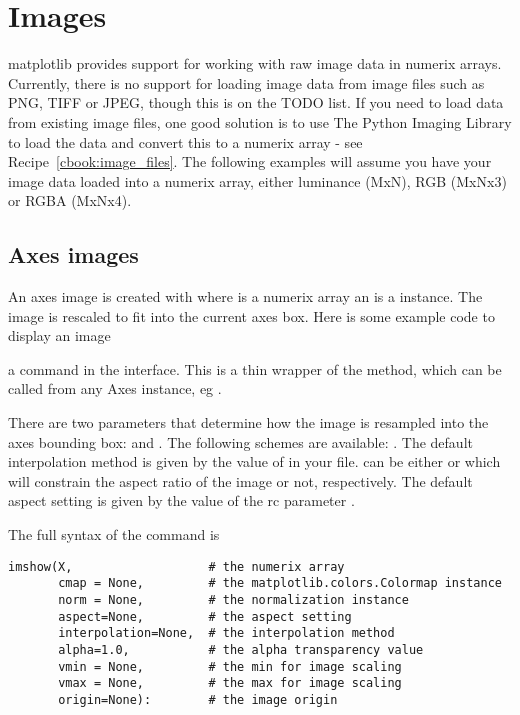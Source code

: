 \documentclass[twoside]{book}
\begin{document}
\section{Images}
\label{sec:images}

matplotlib provides support for working with raw image data in numerix
arrays.  Currently, there is no support for loading image data from
image files such as PNG, TIFF or JPEG, though this is on the TODO
list.  If you need to load data from existing image files, one good
solution is to use The Python Imaging Library to load the data and
convert this to a numerix array - see Recipe~\ref{cbook:image_files}.
The following examples will assume you have your image data loaded
into a numerix array, either luminance (MxN), RGB (MxNx3) or RGBA
(MxNx4).

\subsection{Axes images}
\label{sec:image_axes}
An axes image is created with  where
 is a numerix array an  is a
 instance.  The image is rescaled to fit
into the current axes box.  Here is some example code to display an
image



\noindent {} a command in the 
interface.  This is a thin wrapper of the
 method, which can be called from any
Axes instance, eg .

There are two parameters that determine how the image is resampled
into the axes bounding box:  and .
The following  schemes are available:
.  The default
interpolation method is given by the value of 
in your  file.   can be either
 or  which will constrain the aspect ratio of
the image or not, respectively.  The default aspect setting is given
by the value of the rc parameter .

The full syntax of the  command is

\begin{lstlisting}
imshow(X,                   # the numerix array
       cmap = None,         # the matplotlib.colors.Colormap instance
       norm = None,         # the normalization instance
       aspect=None,         # the aspect setting
       interpolation=None,  # the interpolation method
       alpha=1.0,           # the alpha transparency value
       vmin = None,         # the min for image scaling 
       vmax = None,         # the max for image scaling
       origin=None):        # the image origin

\end{lstlisting}
\end{document}
